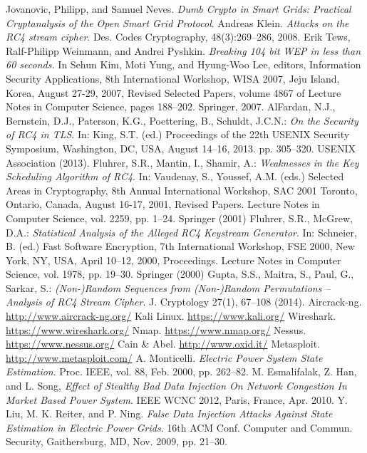 \documentclass[11pt,oneside]{book}
\begin{document}
\begin{thebibliography}{99}
 Jovanovic, Philipp, and Samuel Neves. \emph{Dumb Crypto in Smart Grids: Practical Cryptanalysis of the Open Smart Grid Protocol}.
 Andreas Klein. \emph{Attacks on the RC4 stream cipher}. Des. Codes Cryptography, 48(3):269–286, 2008.
 Erik Tews, Ralf-Philipp Weinmann, and Andrei Pyshkin. \emph{Breaking 104 bit WEP in less than 60 seconds.} In Sehun Kim, Moti Yung, and Hyung-Woo Lee, editors, Information Security Applications, 8th International Workshop, WISA 2007, Jeju Island, Korea, August 27-29, 2007, Revised Selected Papers, volume 4867 of Lecture Notes in Computer Science, pages 188–202. Springer, 2007.
 AlFardan, N.J., Bernstein, D.J., Paterson, K.G., Poettering, B., Schuldt, J.C.N.: \emph{On the Security of RC4 in TLS}. In: King, S.T. (ed.) Proceedings of the 22th USENIX Security Symposium, Washington, DC, USA, August 14–16, 2013. pp. 305–320. USENIX Association (2013).
 Fluhrer, S.R., Mantin, I., Shamir, A.: \emph{Weaknesses in the Key Scheduling Algorithm of RC4}. In: Vaudenay, S., Youssef, A.M. (eds.) Selected Areas in Cryptography, 8th Annual International Workshop, SAC 2001 Toronto, Ontario, Canada, August 16-17, 2001, Revised Papers. Lecture Notes in Computer Science, vol. 2259, pp. 1–24. Springer (2001)
 Fluhrer, S.R., McGrew, D.A.: \emph{Statistical Analysis of the Alleged RC4 Keystream Generator}. In: Schneier, B. (ed.) Fast Software Encryption, 7th International Workshop, FSE 2000, New York, NY, USA, April 10–12, 2000, Proceedings. Lecture Notes in Computer Science, vol. 1978, pp. 19–30. Springer (2000)
 Gupta, S.S., Maitra, S., Paul, G., Sarkar, S.: \emph{(Non-)Random Sequences from (Non-)Random Permutations – Analysis of RC4 Stream Cipher}. J. Cryptology 27(1), 67–108 (2014).
 Aircrack-ng. \url{http://www.aircrack-ng.org/}
 Kali Linux. \url{https://www.kali.org/}
 Wireshark. \url{https://www.wireshark.org/}
 Nmap. \url{https://www.nmap.org/}
 Nessus. \url{https://www.nessus.org/}
 Cain \& Abel. \url{http://www.oxid.it/}
 Metasploit. \url{http://www.metasploit.com/}
 A. Monticelli. \emph{Electric Power System State Estimation}. Proc. IEEE, vol. 88, Feb. 2000, pp. 262–82.
 M. Esmalifalak, Z. Han, and L. Song, \emph{Effect of Stealthy Bad Data Injection On Network Congestion In Market Based Power System}. IEEE WCNC 2012, Paris, France, Apr. 2010.
 Y. Liu, M. K. Reiter, and P. Ning. \emph{False Data Injection Attacks Against State Estimation in Electric Power Grids}. 16th ACM Conf. Computer and Commun. Security, Gaithersburg, MD, Nov. 2009, pp. 21–30.

\end{thebibliography}
\end{document}
